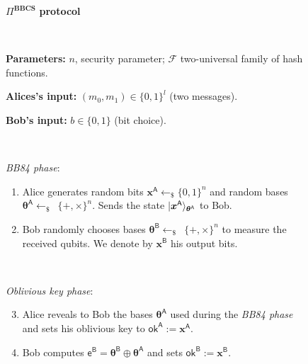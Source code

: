 \begin{figure}[h!]
    \centering
        \begin{tcolorbox}
            
            \centerline{$\Pi^{\textbf{BBCS}}$ \textbf{protocol}}
            
            \
            
            \textbf{Parameters:} $n$, security parameter; $\mathcal{F}$ two-universal family of hash functions.
            
            \textbf{Alices's input:} $(m_0, m_1)\in\{0,1\}^l$ (two messages). 
            
            \textbf{Bob's input:} $b\in\{0,1\}$ (bit choice).
            
            \
            
            \textit{BB84 phase}:
            \begin{enumerate}
                \item Alice generates random bits $\bm{x}^{\mathsf{A}}\leftarrow_{\$}\{0,1\}^n$ and random bases $\bm{\theta}^{\mathsf{A}}\leftarrow_{\$}$~$\{+,\times\}^n$. Sends the state $| \bm{x}^{\mathsf{A}} \rangle_{\bm{\theta}^{\mathsf{A}}}$ to Bob.
                \item Bob randomly chooses bases $\bm{\theta}^{\mathsf{B}}\leftarrow_{\$}$~$\{+,\times\}^n$ to measure the received qubits. We denote by $\bm{x}^{\mathsf{B}}$ his output bits.
            \end{enumerate}
            
            \
            
            \textit{Oblivious key phase}:
            \begin{enumerate}
            \setcounter{enumi}{2}
                \item Alice reveals to Bob the bases $\bm{\theta}^{\mathsf{A}}$ used during the \textit{BB84 phase} and sets his oblivious key to $\mathsf{ok}^{\mathsf{A}}:=\bm{x}^{\mathsf{A}}$.
                \item Bob computes $\mathsf{e}^\mathsf{B} = \bm{\theta}^{\mathsf{B}} \oplus \bm{\theta}^{\mathsf{A}}$ and sets $\mathsf{ok}^{\mathsf{B}}:=\bm{x}^{\mathsf{B}}$.
            \end{enumerate}
            
            \
            

\end{tcolorbox}
\end{figure}
